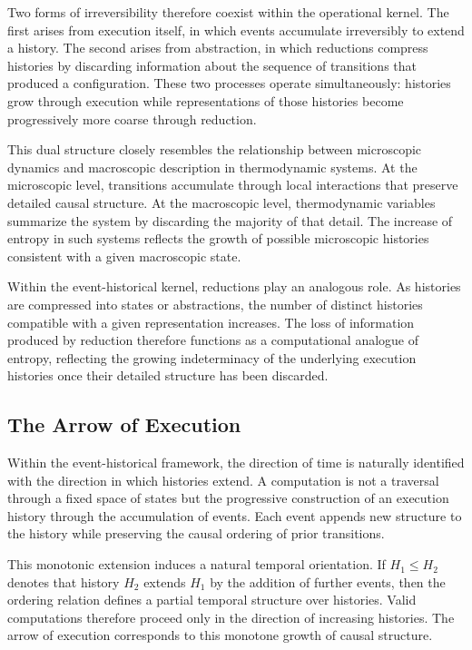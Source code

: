 \documentclass[12pt]{article}
\begin{document}
Two forms of irreversibility therefore coexist within the
operational kernel. The first arises from execution itself,
in which events accumulate irreversibly to extend a history.
The second arises from abstraction, in which reductions compress
histories by discarding information about the sequence of
transitions that produced a configuration. These two processes
operate simultaneously: histories grow through execution while
representations of those histories become progressively more
coarse through reduction.

This dual structure closely resembles the relationship between
microscopic dynamics and macroscopic description in thermodynamic
systems. At the microscopic level, transitions accumulate through
local interactions that preserve detailed causal structure. At
the macroscopic level, thermodynamic variables summarize the
system by discarding the majority of that detail. The increase
of entropy in such systems reflects the growth of possible
microscopic histories consistent with a given macroscopic state.

Within the event-historical kernel, reductions play an analogous
role. As histories are compressed into states or abstractions,
the number of distinct histories compatible with a given
representation increases. The loss of information produced by
reduction therefore functions as a computational analogue of
entropy, reflecting the growing indeterminacy of the underlying
execution histories once their detailed structure has been
discarded.

\subsection{The Arrow of Execution}

Within the event-historical framework, the direction of time
is naturally identified with the direction in which histories
extend. A computation is not a traversal through a fixed
space of states but the progressive construction of an
execution history through the accumulation of events.
Each event appends new structure to the history while
preserving the causal ordering of prior transitions.

This monotonic extension induces a natural temporal
orientation. If $H_1 \leq H_2$ denotes that history
$H_2$ extends $H_1$ by the addition of further events,
then the ordering relation defines a partial temporal
structure over histories. Valid computations therefore
proceed only in the direction of increasing histories.
The arrow of execution corresponds to this monotone
growth of causal structure.
\end{document}
